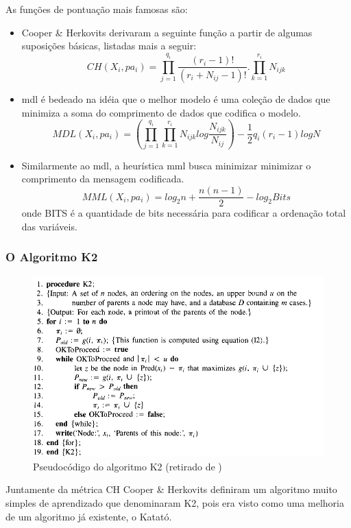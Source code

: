 As funções de pontuação mais famosas são:
\begin{itemize}
	\item Cooper \& Herkovits \cite{cooper92} derivaram a seguinte função a partir de algumas suposições básicas, listadas mais a seguir:
	\begin{equation}
	CH(X_i, pa_i) = \prod_{j=1}^{q_i}\frac{(r_i - 1)!}{(r_i + N_{ij} - 1)!}.\prod_{k=1}^{r_i}N_{ijk}
	\end{equation}

	\item \gls{mdl}\cite{cheng02} é bedeado na idéia que o melhor modelo é uma coleção de dados que minimiza a soma do comprimento de dados que codifica o modelo.
	\begin{equation}
	MDL(X_i,pa_i) = (\prod_{j=1}^{q_i}\prod_{k=1}^{r_i}N_{ijk}log\frac{N_{ijk}}{N_{ij}})-\frac{1}{2}q_i(r_i-1)logN
	\end{equation}

	\item Similarmente ao \gls{mdl}, a heurística \gls{mml} busca minimizar minimizar o comprimento da mensagem codificada.
	\begin{equation}
	MML(X_i,pa_i) = log_2 n + \frac{n(n-1)}{2}-log_2Bits
	\end{equation}
	onde BITS é a quantidade de bits necessária para codificar a ordenação total das variáveis.
\end{itemize}

\subsubsection{O Algoritmo K2}
\begin{figure}[htb]
	\centering
	\includegraphics[width = 450px]{figuras/K2}
	\caption{Pseudocódigo do algoritmo K2 (retirado de \cite{cooper92})}
	\label{fig:K2}
\end{figure}
Juntamente da métrica CH Cooper \& Herkovits \cite{cooper92} definiram um algoritmo muito simples de aprendizado que denominaram K2, pois era visto como uma melhoria de um algoritmo já existente, o Katató.

